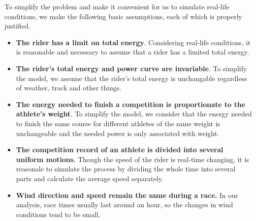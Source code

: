 To simplify the problem and make it convenient for us to simulate real-life conditions, we make the following basic assumptions, each of which is properly justified.

\begin{itemize}
	\item {\bf The rider has a limit on total energy}.  Considering real-life conditions, it is reasonable and necessary to assume that a rider has a limited total energy.
	
	\item {\bf The rider's total energy and power curve are invariable}. To simplify the model, we assume that the rider's total energy is unchangable regardless of weather, track and other things.
	
	\item {\bf The energy needed to finish a competition is proportionate to the athlete's weight}. To simplify the model, we consider that the energy needed to finish the same course for different athletes of the same weight is unchangeable and the needed power is only associated with weight.
	
	\item{\bf The competition record of an athlete is divided into several uniform motions.} Though the speed of the rider is real-time changing, it is reasonale to simulate the process by dividing the whole time into several parts and calculate the average speed separately. 
	
	\item{\bf Wind direction and speed remain the same during a race.} In our analysis, race times usually last around an hour, so the changes in wind conditions tend to be small.
	
\end{itemize}
\newpage